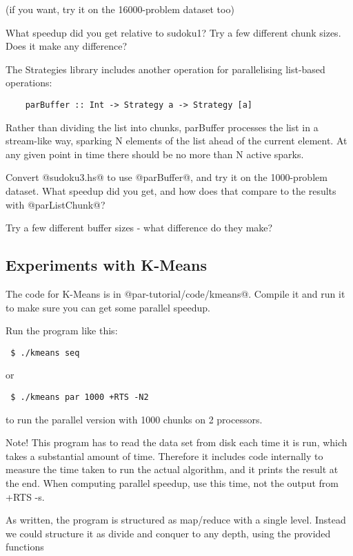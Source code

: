 \documentclass[11pt,a4paper]{article}
\begin{document}
\noindent (if you want, try it on the 16000-problem dataset too)

What speedup did you get relative to sudoku1?  Try a few different
chunk sizes.  Does it make any difference?

The Strategies library includes another operation for parallelising
list-based operations:

{\small \begin{verbatim}
    parBuffer :: Int -> Strategy a -> Strategy [a]
\end{verbatim}}

Rather than dividing the list into chunks, parBuffer processes the
list in a stream-like way, sparking N elements of the list ahead of
the current element.  At any given point in time there should be no
more than N active sparks.

Convert @sudoku3.hs@ to use @parBuffer@, and try it on the
1000-problem dataset.  What speedup did you get, and how does that
compare to the results with @parListChunk@?

Try a few different buffer sizes - what difference do they make?

\subsection{Experiments with K-Means}

The code for K-Means is in @par-tutorial/code/kmeans@.  Compile it and
run it to make sure you can get some parallel speedup.

Run the program like this:

{\small \begin{verbatim}
 $ ./kmeans seq
\end{verbatim}}

or

{\small \begin{verbatim}
 $ ./kmeans par 1000 +RTS -N2
\end{verbatim}}

to run the parallel version with 1000 chunks on 2 processors.

Note!  This program has to read the data set from disk each time it is
run, which takes a substantial amount of time.  Therefore it includes
code internally to measure the time taken to run the actual algorithm,
and it prints the result at the end.  When computing parallel speedup,
use this time, not the output from +RTS -s.

As written, the program is structured as map/reduce with a single
level.  Instead we could structure it as divide and conquer to any
depth, using the provided functions
\end{document}
